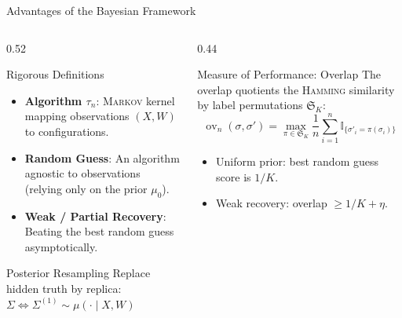 \documentclass[A4,svgnames,9pt,aspectratio=169]{beamer}
\newcommand{\ov}{\operatorname{ov}}
\newcommand{\ind}[1]{\mathbb{I}_{\{#1\}}}
\begin{document}
\begin{frame}{Advantages of the Bayesian Framework}
  \begin{columns}[T]
    \begin{column}{0.52\textwidth}
      \begin{block}{Rigorous Definitions}
        \begin{itemize}
          \item \textbf{Algorithm $\tau_n$}: \textsc{Markov} kernel mapping observations $(X, W)$ to configurations.
          \item \textbf{Random Guess}: An algorithm agnostic to observations (relying only on the prior $\mu_0$).
          \item \textbf{Weak / Partial Recovery}: Beating the best random guess asymptotically.
        \end{itemize}
      \end{block}
      
      \begin{block}{Posterior Resampling}
        Replace hidden truth by replica: $\Sigma \iff \Sigma^{(1)} \sim \mu( \cdot \mid X, W)$
      \end{block}
    \end{column}
    
    \begin{column}{0.44\textwidth}
      \begin{block}{Measure of Performance: Overlap}
        The overlap quotients the \textsc{Hamming} similarity by label permutations $\mathfrak{S}_K$:
        \begin{equation*}
            \ov_n(\sigma, \sigma') = \max_{\pi \in \mathfrak{S}_K} \frac{1}{n} \sum_{i=1}^n \ind{\sigma'_i = \pi(\sigma_i)}
        \end{equation*}
        \vspace{0.2em}
        \begin{itemize}
          \item Uniform prior: best random guess score is $1/K$.
          \item Weak recovery: overlap $\ge 1/K + \eta$.
        \end{itemize}
      \end{block}
    \end{column}
  \end{columns}
\end{frame}
\end{document}
